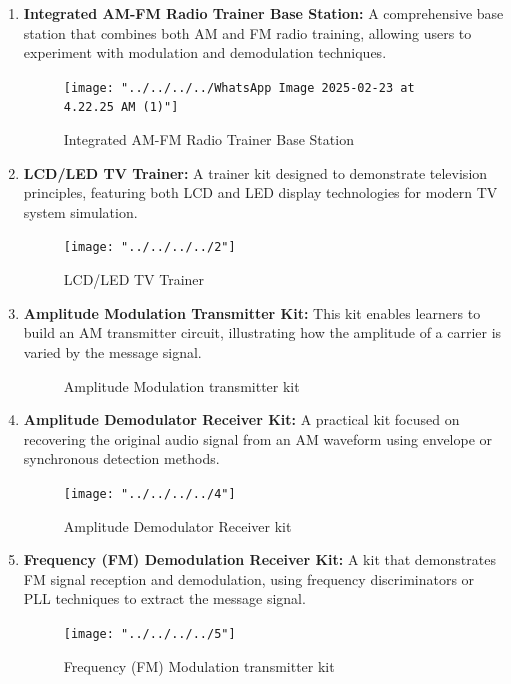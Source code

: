 \documentclass[a4paper,12pt]{article}
\begin{document}
		\begin{enumerate}
			\item \textbf{Integrated AM-FM Radio Trainer Base Station:} A comprehensive base station that combines both AM and FM radio training, allowing users to experiment with modulation and demodulation techniques.
			\begin{figure}[H]
				\centering
				\texttt{[image: "../../../../WhatsApp Image 2025-02-23 at 4.22.25 AM (1)"]}
				\caption{Integrated AM-FM Radio Trainer Base Station}
				
			\end{figure}
			
			\item \textbf{LCD/LED TV Trainer:} A trainer kit designed to demonstrate television principles, featuring both LCD and LED display technologies for modern TV system simulation.
			\begin{figure}[H]
				\centering
				\texttt{[image: "../../../../2"]}
				\caption{LCD/LED TV Trainer}
				
			\end{figure}
			
			
			
			
			
			\item \textbf{Amplitude Modulation Transmitter Kit:} This kit enables learners to build an AM transmitter circuit, illustrating how the amplitude of a carrier is varied by the message signal.
			
			\begin{figure}[H]
				\centering
				\caption{Amplitude Modulation transmitter kit}
				
			\end{figure}
			
			
			
			\item \textbf{Amplitude Demodulator Receiver Kit:} A practical kit focused on recovering the original audio signal from an AM waveform using envelope or synchronous detection methods.
				\begin{figure}[H]
				\centering
				\texttt{[image: "../../../../4"]}
				\caption{Amplitude Demodulator Receiver kit}
				
			\end{figure}
			
			
			
			
			
			
			\item \textbf{Frequency (FM) Demodulation Receiver Kit:} A kit that demonstrates FM signal reception and demodulation, using frequency discriminators or PLL techniques to extract the message signal.
			\begin{figure}[H]
				\centering
				\texttt{[image: "../../../../5"]}
				\caption{Frequency (FM) Modulation transmitter kit}
				

\end{figure}
\end{enumerate}
\end{document}
